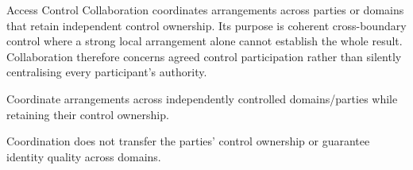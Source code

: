 Access Control Collaboration coordinates arrangements across parties or domains that retain independent control ownership. Its purpose is coherent cross-boundary control where a strong local arrangement alone cannot establish the whole result. Collaboration therefore concerns agreed control participation rather than silently centralising every participant's authority.



Coordinate arrangements across independently controlled domains/\allowbreak{}parties while retaining their control ownership.



Coordination does not transfer the parties' control ownership or guarantee identity quality across domains.


